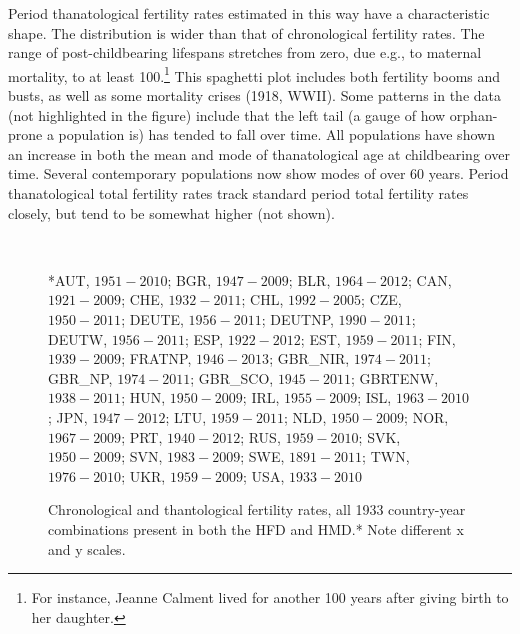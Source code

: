 \documentclass{article}
\begin{document}
Period thanatological fertility rates estimated in this way have a
characteristic shape. The distribution is wider than that of chronological
fertility rates. The range of post-childbearing lifespans stretches from 
zero, due e.g., to maternal mortality, to at least 100.\footnote{For instance,
Jeanne Calment lived for another 100 years after giving birth to her daughter.}
This spaghetti plot includes both fertility booms and busts, as well as some
mortality crises (1918, WWII). Some patterns in the data (not
highlighted in the figure) include that the left tail (a gauge of how
orphan-prone a population is) has tended to fall over time. All populations have shown an increase in both the
mean and mode of thanatological age at childbearing over time. Several
contemporary populations now show modes of over 60 years. Period thanatological total
fertility rates track standard period total fertility rates closely, but tend to be somewhat higher (not shown).
\begin{figure}[h!]
	\caption{Chronological and thantological fertility rates, all 1933
	country-year combinations present in both the HFD and HMD.* Note different x
	and y scales.}
	\label{fig:Fxcompare}
	\begin{center}
	\\
	\end{center}
	\begin{tiny}
	*AUT, $1951-2010$; BGR, $1947-2009$; BLR, $1964-2012$; CAN, $1921-2009$; 
	CHE, $1932-2011$; CHL, $1992-2005$; CZE, $1950-2011$; DEUTE, $1956-2011$; 
	DEUTNP, $1990-2011$; DEUTW, $1956-2011$; ESP, $1922-2012$; EST, $1959-2011$; 
	FIN, $1939-2009$; FRATNP, $1946-2013$; GBR\_NIR, $1974-2011$; GBR\_NP,
	$1974-2011$; GBR\_SCO, $1945-2011$; GBRTENW, $1938-2011$; HUN, $1950-2009$;
	IRL, $1955-2009$; ISL, $1963-2010$; JPN, $1947-2012$; LTU, $1959-2011$; NLD, $1950-2009$; 
	NOR, $1967-2009$; PRT, $1940-2012$; RUS, $1959-2010$; SVK, $1950-2009$; 
	SVN, $1983-2009$; SWE, $1891-2011$; TWN, $1976-2010$; UKR, $1959-2009$; 
	USA, $1933-2010$
	\end{tiny}
\end{figure}
\end{document}

